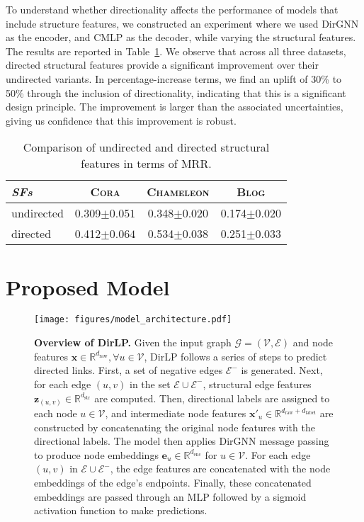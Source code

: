 \documentclass{article}
\begin{document}
To understand whether directionality affects the performance of models that include structure features, we constructed an experiment where we used DirGNN as the encoder, and CMLP as the decoder, while varying the structural features. The results are reported in Table~\ref{t:ablation_SFs}. We observe that across all three datasets, directed structural features provide a significant improvement over their undirected variants. In percentage-increase terms, we find an uplift of 30\% to 50\% through the inclusion of directionality, indicating that this is a significant design principle. The improvement is larger than the associated uncertainties, giving us confidence that this improvement is robust.

\begin{table}[h]
\caption{Comparison of undirected and directed structural features in terms of MRR. } 
\centering
\label{t:ablation_SFs}
\begin{tabular}{l c c c}
\textit{SFs}  & \textsc{Cora}  & \textsc{Chameleon} & \textsc{Blog}  \\
\hline
undirected      & 0.309${\scriptstyle\pm0.051}$ & 0.348${\scriptstyle\pm0.020}$ &  0.174${\scriptstyle\pm0.020}$ \\
directed        & \textcolor{junscolor1}{0.412${\scriptstyle\pm0.064}$} & \textcolor{junscolor1}{0.534${\scriptstyle\pm0.038}$} &  \textcolor{junscolor1}{0.251${\scriptstyle\pm0.033}$}
\end{tabular}
\end{table}

\section{Proposed Model}\label{sec:proposed}

\begin{figure}[t]
    \centering
    \texttt{[image: figures/model\_architecture.pdf]}
    \caption{\textbf{Overview of DirLP.} Given the input graph $\mathcal{G} = (\mathcal{V}, \mathcal{E})$ and node features $\mathbf{x} \in \mathbb{R}^{d_{\operatorname{raw}}}, \forall u \in \mathcal{V}$, DirLP follows a series of steps to predict directed links. First, a set of negative edges $\mathcal{E}^{-}$ is generated. Next, for each edge $(u, v)$ in the set $\mathcal{E} \cup \mathcal{E}^{-}$, structural edge features $\mathbf{z}_{(u,v)} \in \mathbb{R}^{d_{\operatorname{str}}}$ are computed. Then, directional labels are assigned to each node $u \in \mathcal{V}$, and intermediate node features $\mathbf{x}'_u \in \mathbb{R}^{d_{\operatorname{raw}} + d_{\operatorname{label}}}$ are constructed by concatenating the original node features with the directional labels. The model then applies DirGNN message passing to produce node embeddings $\mathbf{e}_u \in \mathbb{R}^{d_{\operatorname{enc}}}$ for $u\in\mathcal{V}$. For each edge $(u, v)$ in $\mathcal{E} \cup \mathcal{E}^{-}$, the edge features are concatenated with the node embeddings of the edge's endpoints. Finally, these concatenated embeddings are passed through an MLP followed by a sigmoid activation function to make predictions.}
\label{fig:model_architecture}
\end{figure}
\end{document}
